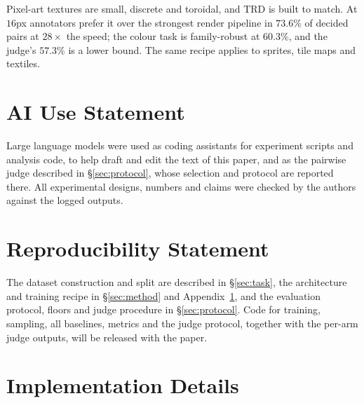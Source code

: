 \documentclass{article}
\newcommand{\trd}{\textsc{TRD}}
\begin{document}
Pixel-art textures are small, discrete and toroidal, and \trd{} is built to
match. At $16$px annotators prefer it over the strongest render pipeline in
$73.6\%$ of decided pairs at $28\times$ the speed; the colour task is
family-robust at $60.3\%$, and the judge's $57.3\%$ is a lower bound. The
same recipe applies to sprites, tile maps and textiles.

\clearpage
\section*{AI Use Statement}
Large language models were used as coding assistants for experiment scripts
and analysis code, to help draft and edit the text of this paper, and as the
pairwise judge described in \S\ref{sec:protocol}, whose selection and
protocol are reported there. All experimental designs, numbers and claims were
checked by the authors against the logged outputs.

\section*{Reproducibility Statement}
The dataset construction and split are described in \S\ref{sec:task}, the
architecture and training recipe in \S\ref{sec:method} and
Appendix~\ref{app:impl}, and the evaluation protocol, floors and judge
procedure in \S\ref{sec:protocol}. Code for training, sampling, all baselines,
metrics and the judge protocol, together with the per-arm judge outputs, will
be released with the paper.




\appendix
\raggedbottom
\section{Implementation Details}
\label{app:impl}
\end{document}
